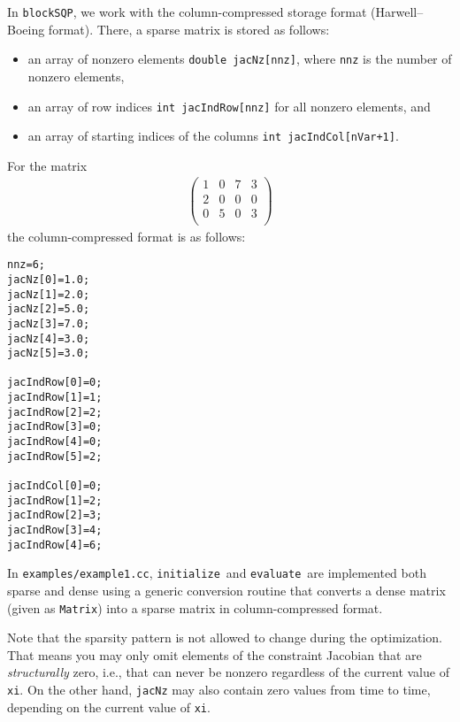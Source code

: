 \documentclass[	11pt,
				a4paper,
				abstract=true,
				twoside=true,
				bibliography=totoc, 
				headinclude=true,
				footinclude=false]{scrartcl}
\newcommand{\blockSQP}{\texttt{blockSQP}}
\newcommand{\init}{\texttt{initialize}}
\newcommand{\evaluate}{\texttt{evaluate}}
\begin{document}
In \blockSQP, we work with the column-compressed storage format (Harwell--Boeing format). There, a sparse matrix is stored as follows:
\begin{itemize}
\item an array of nonzero elements \texttt{double jacNz[nnz]}, where \texttt{nnz} is the number of nonzero elements,
\item an array of row indices \texttt{int jacIndRow[nnz]} for all nonzero elements, and
\item an array of starting indices of the columns \texttt{int jacIndCol[nVar+1]}.
\end{itemize}
For the matrix
\begin{align*}
\begin{pmatrix}
1 & 0 & 7 & 3 \\
2 & 0 & 0 & 0 \\
0 & 5 & 0 & 3 \\
\end{pmatrix}
\end{align*}
the column-compressed format is as follows:
\lstset{style=myC}
\begin{lstlisting}
nnz=6;
jacNz[0]=1.0;
jacNz[1]=2.0;
jacNz[2]=5.0;
jacNz[3]=7.0;
jacNz[4]=3.0;
jacNz[5]=3.0;

jacIndRow[0]=0;
jacIndRow[1]=1;
jacIndRow[2]=2;
jacIndRow[3]=0;
jacIndRow[4]=0;
jacIndRow[5]=2;

jacIndCol[0]=0;
jacIndRow[1]=2;
jacIndRow[2]=3;
jacIndRow[3]=4;
jacIndRow[4]=6;
\end{lstlisting}
In \texttt{examples/example1.cc}, \init\ and \evaluate\ are implemented both sparse and dense using a generic conversion routine that converts a dense matrix (given as \texttt{Matrix}) into a sparse matrix in column-compressed format.

Note that the sparsity pattern is not allowed to change during the optimization. That means you may only omit elements of the constraint Jacobian that are \emph{structurally} zero, i.e., that can never be nonzero regardless of the current value of \texttt{xi}. On the other hand, \texttt{jacNz} may also contain zero values from time to time, depending on the current value of \texttt{xi}.

\end{document}
